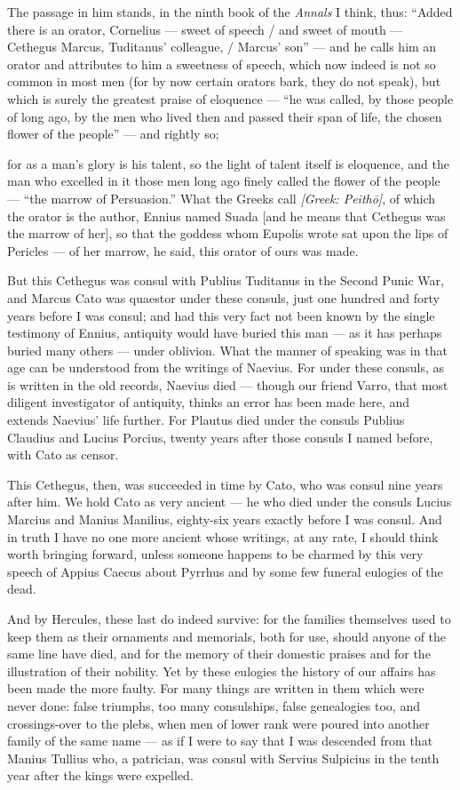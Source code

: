  The passage in him stands, in the ninth book of the \textit{Annals} I think, thus: ``Added there is an orator, Cornelius — sweet of speech / and sweet of mouth — Cethegus Marcus, Tuditanus' colleague, / Marcus' son'' — and he calls him an orator and attributes to him a sweetness of speech, which now indeed is not so common in most men (for by now certain orators bark, they do not speak), but which is surely the greatest praise of eloquence — ``he was called, by those people of long ago, by the men who lived then and passed their span of life, the chosen flower of the people'' — and rightly so;

 for as a man's glory is his talent, so the light of talent itself is eloquence, and the man who excelled in it those men long ago finely called the flower of the people — ``the marrow of Persuasion.'' What the Greeks call \textit{[Greek: Peithō]}, of which the orator is the author, Ennius named Suada [and he means that Cethegus was the marrow of her], so that the goddess whom Eupolis wrote sat upon the lips of Pericles — of her marrow, he said, this orator of ours was made.

 But this Cethegus was consul with Publius Tuditanus in the Second Punic War, and Marcus Cato was quaestor under these consuls, just one hundred and forty years before I was consul; and had this very fact not been known by the single testimony of Ennius, antiquity would have buried this man — as it has perhaps buried many others — under oblivion. What the manner of speaking was in that age can be understood from the writings of Naevius. For under these consuls, as is written in the old records, Naevius died — though our friend Varro, that most diligent investigator of antiquity, thinks an error has been made here, and extends Naevius' life further. For Plautus died under the consuls Publius Claudius and Lucius Porcius, twenty years after those consuls I named before, with Cato as censor.

 This Cethegus, then, was succeeded in time by Cato, who was consul nine years after him. We hold Cato as very ancient — he who died under the consuls Lucius Marcius and Manius Manilius, eighty-six years exactly before I was consul. And in truth I have no one more ancient whose writings, at any rate, I should think worth bringing forward, unless someone happens to be charmed by this very speech of Appius Caecus about Pyrrhus and by some few funeral eulogies of the dead.

 And by Hercules, these last do indeed survive: for the families themselves used to keep them as their ornaments and memorials, both for use, should anyone of the same line have died, and for the memory of their domestic praises and for the illustration of their nobility. Yet by these eulogies the history of our affairs has been made the more faulty. For many things are written in them which were never done: false triumphs, too many consulships, false genealogies too, and crossings-over to the plebs, when men of lower rank were poured into another family of the same name — as if I were to say that I was descended from that Manius Tullius who, a patrician, was consul with Servius Sulpicius in the tenth year after the kings were expelled.


